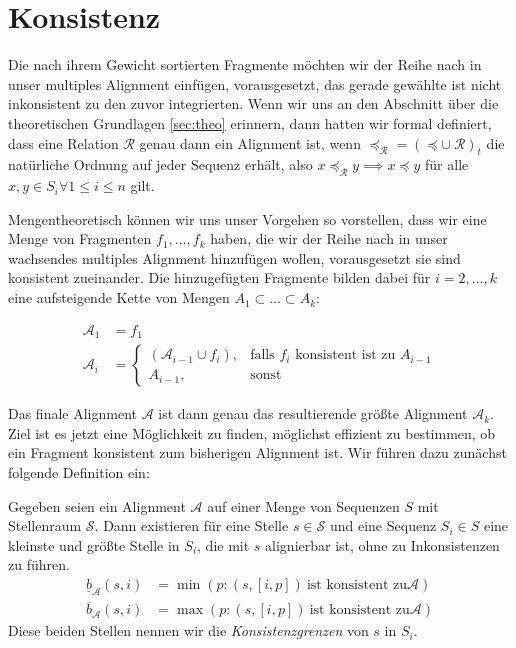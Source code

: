 \section{Konsistenz}

Die nach ihrem Gewicht sortierten Fragmente möchten wir der Reihe nach in unser multiples Alignment einfügen, vorausgesetzt, das gerade gewählte ist nicht inkonsistent zu den zuvor integrierten. Wenn wir uns an den Abschnitt über die theoretischen Grundlagen \ref{sec:theo} erinnern, dann hatten wir formal definiert, dass eine Relation $\mathcal{R}$ genau dann ein Alignment ist, wenn $\preceq_{\mathcal{R}}=(\preceq \cup\: \mathcal{R})_t$ die natürliche Ordnung auf jeder Sequenz erhält, also $x \preceq_{\mathcal{R}} y \implies x \preceq y$ für alle $x,y \in S_i \forall 1\leq i \leq n$ gilt.

Mengentheoretisch können wir uns unser Vorgehen so vorstellen, dass wir eine Menge von Fragmenten $f_1,\dots, f_k$ haben, die wir der Reihe nach in unser wachsendes multiples Alignment hinzufügen wollen, vorausgesetzt sie sind konsistent zueinander. Die hinzugefügten Fragmente bilden dabei für $i = 2, \dots, k$ eine aufsteigende Kette von Mengen $A_1 \subset \dots \subset A_k$:

\begin{equation}
\begin{split}
	\mathcal{A}_1 &= f_1 \\
	\mathcal{A}_i &= 
		\begin{cases}
			(\mathcal{A}_{i-1} \cup f_i), & \text{falls $f_i$ konsistent ist zu $A_{i-1}$} \\
			A_{i-1}, & \text{sonst} 
		\end{cases}
\end{split}
\end{equation} 

Das finale Alignment $\mathcal{A}$ ist dann genau das resultierende größte Alignment $\mathcal{A}_k$. Ziel ist es jetzt eine Möglichkeit zu finden, möglichst effizient zu bestimmen, ob ein Fragment konsistent zum bisherigen Alignment ist. Wir führen dazu zunächst folgende Definition ein:

\begin{definition}
	Gegeben seien ein Alignment $\mathcal{A}$ auf einer Menge von Sequenzen $S$ mit Stellenraum $\mathcal{S}$. Dann existieren für eine Stelle $s \in \mathcal{S}$ und eine Sequenz $S_i \in S$ eine kleinste und größte Stelle in $S_i$, die mit $s$ alignierbar ist, ohne zu Inkonsistenzen zu führen.
	\begin{equation}
	\begin{split}
	\underline{b}_\mathcal{A}(s,i) &= \min(p: (s,[i,p])\: \text{ist konsistent zu} \mathcal{A}) \\
	\overline{b}_\mathcal{A}(s,i) &= \max(p: (s,[i,p])\: \text{ist konsistent zu} \mathcal{A})
	\end{split} 
	\end{equation}
	Diese beiden Stellen nennen wir die \emph{Konsistenzgrenzen} von $s$ in $S_i$. 
\end{definition}

